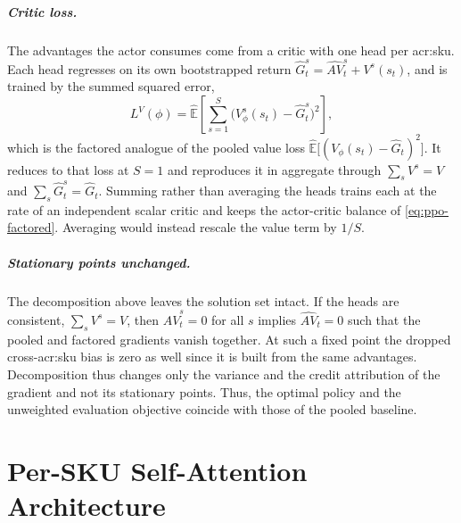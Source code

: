 \paragraph{\textbf{Critic loss.}} The advantages the actor consumes come from a critic with one head
per \gls{acr:sku}. Each head regresses on its own bootstrapped return
$\hat G_t^{s}=\widehat{AV}_t^{s}+V^{s}(s_t)$, and is trained by the summed squared error,
\begin{equation}
L^{V}(\phi)=\hat{\mathbb{E}}\!\left[\sum_{s=1}^{S}\big(V_\phi^{s}(s_t)-\hat G_t^{s}\big)^{2}\right],
\label{eq:vloss}
\end{equation}
which is the factored analogue of the pooled value loss $\hat{\mathbb{E}}\big[(V_\phi(s_t)-\hat G_t)^2\big]$. It reduces to that loss at $S=1$ and reproduces it in aggregate through $\sum_s V^{s}=V$ and $\sum_s \hat G_t^{s}=\hat G_t$. Summing
rather than averaging the heads trains each at the rate of an independent scalar critic and keeps
the actor-critic balance of \eqref{eq:ppo-factored}. Averaging would instead rescale the value term
by $1/S$.

\paragraph{\textbf{Stationary points unchanged.}} The decomposition above leaves the solution set intact.
If the heads are consistent, $\sum_s V^{s}=V$, then $\widehat{AV}_t^{s}=0$ for all $s$ implies
$\widehat{AV}_t=0$ such that the pooled and factored gradients vanish together. At such a fixed point the
dropped cross-\gls{acr:sku} bias is zero as well since it is built from the same advantages.
Decomposition thus changes only the variance and the credit attribution of the gradient and not
its stationary points. Thus, the optimal policy and the unweighted evaluation objective coincide with those of the pooled baseline.




















\newpage
\chapter{Per-SKU Self-Attention Architecture}
\label{ap:sku-attention}

